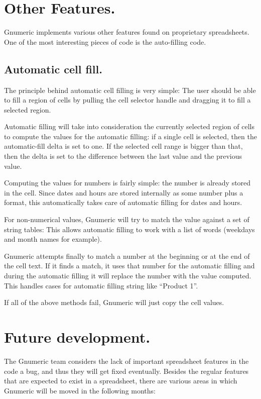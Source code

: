 \documentclass[12pt,twoside,twocolumn]{article}
\begin{document}
\section{Other Features.}

Gnumeric implements various other features found on proprietary
spreadsheets.  One of the most interesting pieces of code is the
auto-filling code.

\subsection{Automatic cell fill.}

The principle behind automatic cell filling is very simple: The user
should be able to fill a region of cells by pulling the cell selector
handle and dragging it to fill a selected region.

Automatic filling will take into consideration the currently selected
region of cells to compute the values for the automatic filling: if a
single cell is selected, then the automatic-fill delta is set to one.
If the selected cell range is bigger than that, then the delta is set
to the difference between the last value and the previous value.

Computing the values for numbers is fairly simple: the number is
already stored in the cell.  Since dates and hours are stored
internally as some number plus a format, this automatically takes care
of automatic filling for dates and hours. 

For non-numerical values, Gnumeric will try to match the value against
a set of string tables: This allows automatic filling to work with a
list of words (weekdays and month names for example).

Gnumeric attempts finally to match a number at the beginning or at the
end of the cell text.  If it finds a match, it uses that number for
the automatic filling and during the automatic filling it will replace
the number with the value computed.  This handles cases for automatic
filling string like ``Product 1''. 

If all of the above methods fail, Gnumeric will just copy the cell
values. 

\section{Future development.}

    The Gnumeric team considers the lack of important spreadsheet
features in the code a bug, and thus they will get fixed eventually.
Besides the regular features that are expected to exist in a
spreadsheet, there are various areas in which Gnumeric will be moved
in the following months: 
\end{document}
